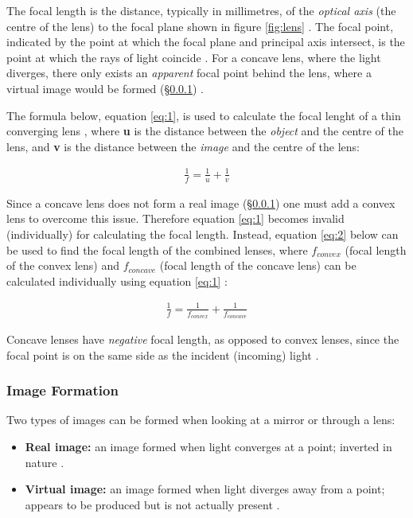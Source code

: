 \documentclass[12pt]{article}
\begin{document}
The focal length is the distance, typically in millimetres, of the \textit{optical axis} (the centre of the lens) to the focal plane shown in figure \ref{fig:lens}
\cite{canonfocal,studyfocal}.
The focal point, indicated by the point at which the focal plane and principal axis intersect, is the point at which the rays of light coincide
\cite{isaaclens}.
For a concave lens, where the light diverges, there only exists an \textit{apparent} focal point behind the lens, where a virtual image would be formed (§\ref{sec:1.1.2})
\cite{isaaclens}.

The formula below, equation \ref{eq:1}, is used to calculate the focal lenght of a thin converging lens \cite{UCDlens,isaaclens}, where \textbf{u} is the distance
between the \textit{object} and the centre of the lens, and \textbf{v} is the distance between the \textit{image} and the centre of the lens:

\begin{gather} \label{eq:1}
    \frac{1}{f} = \frac{1}{u} + \frac{1}{v}
\end{gather}

Since a concave lens does not form a real image (§\ref{sec:1.1.2}) one must add a convex lens to overcome this issue. Therefore equation \ref{eq:1} becomes invalid (individually) for calculating the focal length.
Instead, equation \ref{eq:2} below can be used to find the focal length of the combined lenses, where $f_{convex}$ (focal length of the convex lens) and $f_{concave}$ (focal length of the concave lens) can be calculated individually
using equation \ref{eq:1} \cite{UCDlens}:  

\begin{gather} \label{eq:2}
    \frac{1}{f} = \frac{1}{f_{convex}} + \frac{1}{f_{concave}}
\end{gather}

Concave lenses have \textit{negative} focal length, as opposed to convex lenses, since the focal point is on the same side as the incident (incoming) light \cite{geekconcave}.

\subsubsection{Image Formation} \label{sec:1.1.2}

Two types of images can be formed when looking at a mirror or through a lens:
\begin{itemize}
    \item \textbf{Real image:} an image formed when light converges at a point; inverted in nature \cite{geekrelvir}.
    \item \textbf{Virtual image:} an image formed when light diverges away from a point; appears to be produced but is not actually present \cite{geekrelvir}.
\end{itemize}
\end{document}
